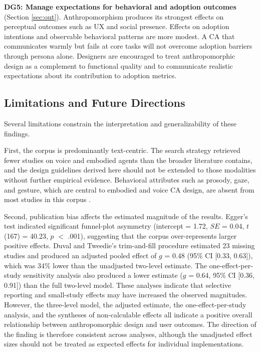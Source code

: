 \documentclass[preprint,review,12pt,authoryear,nonatbib]{elsarticle}
\begin{document}
\textbf{DG5: Manage expectations for behavioral and adoption outcomes} (Section \ref{sec:out}). Anthropomorphism produces its strongest effects on perceptual outcomes such as UX and social presence. Effects on adoption intentions and observable behavioral patterns are more modest. A CA that communicates warmly but fails at core tasks will not overcome adoption barriers through persona alone. Designers are encouraged to treat anthropomorphic design as a complement to functional quality and to communicate realistic expectations about its contribution to adoption metrics.

\subsection{Limitations and Future Directions}

Several limitations constrain the interpretation and generalizability of these findings.

First, the corpus is predominantly text-centric. The search strategy retrieved fewer studies on voice and embodied agents than the broader literature contains, and the design guidelines derived here should not be extended to those modalities without further empirical evidence. Behavioral attributes such as prosody, gaze, and gesture, which are central to embodied and voice CA design, are absent from most studies in this corpus \parencite{cassell2000embodied,bickmore2005relational}.

Second, publication bias affects the estimated magnitude of the results. Egger's test indicated significant funnel-plot asymmetry (intercept = 1.72, $SE$ = 0.04, $t$(167) = 40.23, $p$ $<$ .001), suggesting that the corpus over-represents larger positive effects. Duval and Tweedie's trim-and-fill procedure estimated 23 missing studies and produced an adjusted pooled effect of $g$ = 0.48 (95\% CI [0.33, 0.63]), which was 34\% lower than the unadjusted two-level estimate. The one-effect-per-study sensitivity analysis also produced a lower estimate ($g$ = 0.64, 95\% CI [0.36, 0.91]) than the full two-level model. These analyses indicate that selective reporting and small-study effects may have increased the observed magnitudes. However, the three-level model, the adjusted estimate, the one-effect-per-study analysis, and the syntheses of non-calculable effects all indicate a positive overall relationship between anthropomorphic design and user outcomes. The direction of the finding is therefore consistent across analyses, although the unadjusted effect sizes should not be treated as expected effects for individual implementations.
\end{document}
